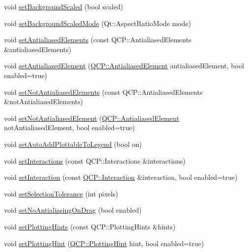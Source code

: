 \begin{DoxyCompactItemize}
\item 
void \hyperlink{classQCustomPlot_a36f0fa1317325dc7b7efea615ee2de1f}{set\+Background\+Scaled} (bool scaled)
\item 
void \hyperlink{classQCustomPlot_a4c0eb4865b7949f62e1cb97db04a3de0}{set\+Background\+Scaled\+Mode} (Qt\+::\+Aspect\+Ratio\+Mode mode)
\item 
void \hyperlink{classQCustomPlot_af6f91e5eab1be85f67c556e98c3745e8}{set\+Antialiased\+Elements} (const Q\+C\+P\+::\+Antialiased\+Elements \&antialiased\+Elements)
\item 
void \hyperlink{classQCustomPlot_aeef813bcf7efab8e765f9f87ec454691}{set\+Antialiased\+Element} (\hyperlink{namespaceQCP_ae55dbe315d41fe80f29ba88100843a0c}{Q\+C\+P\+::\+Antialiased\+Element} antialiased\+Element, bool enabled=true)
\item 
void \hyperlink{classQCustomPlot_ae10d685b5eabea2999fb8775ca173c24}{set\+Not\+Antialiased\+Elements} (const Q\+C\+P\+::\+Antialiased\+Elements \&not\+Antialiased\+Elements)
\item 
void \hyperlink{classQCustomPlot_afc657938a707c890e449ae89203a076d}{set\+Not\+Antialiased\+Element} (\hyperlink{namespaceQCP_ae55dbe315d41fe80f29ba88100843a0c}{Q\+C\+P\+::\+Antialiased\+Element} not\+Antialiased\+Element, bool enabled=true)
\item 
void \hyperlink{classQCustomPlot_ad8858410c2db47b7104040a3aa61c3fc}{set\+Auto\+Add\+Plottable\+To\+Legend} (bool on)
\item 
void \hyperlink{classQCustomPlot_a5ee1e2f6ae27419deca53e75907c27e5}{set\+Interactions} (const Q\+C\+P\+::\+Interactions \&interactions)
\item 
void \hyperlink{classQCustomPlot_a422bf1bc6d56dac75a3d805d9a65902c}{set\+Interaction} (const \hyperlink{namespaceQCP_a2ad6bb6281c7c2d593d4277b44c2b037}{Q\+C\+P\+::\+Interaction} \&interaction, bool enabled=true)
\item 
void \hyperlink{classQCustomPlot_a4dc31241d7b09680950e19e5f971ed93}{set\+Selection\+Tolerance} (int pixels)
\item 
void \hyperlink{classQCustomPlot_a775bdcb6329d44701aeaa6135b0e5265}{set\+No\+Antialiasing\+On\+Drag} (bool enabled)
\item 
void \hyperlink{classQCustomPlot_a94a33cbdadbbac5934843508bcfc210d}{set\+Plotting\+Hints} (const Q\+C\+P\+::\+Plotting\+Hints \&hints)
\item 
void \hyperlink{classQCustomPlot_a3b7c97bb6c16464e9e15190c07abe9a9}{set\+Plotting\+Hint} (\hyperlink{namespaceQCP_a5400e5fcb9528d92002ddb938c1f4ef4}{Q\+C\+P\+::\+Plotting\+Hint} hint, bool enabled=true)

\end{DoxyCompactItemize}
